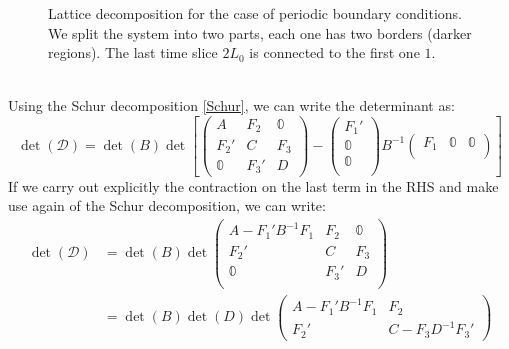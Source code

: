 \begin{figure}

    \caption{Lattice decomposition for the case of periodic boundary conditions. We split the system into two parts, each one has two borders (darker regions). The last time slice $2L_0$ is connected to the first one $1$.}
    \label{fig: fig p bc}
\end{figure}
\\ Using the Schur decomposition \eqref{Schur}, we can write the determinant as:
\begin{equation}
    \det(\mathcal{D}) = \det(B) \det \left[ \begin{pmatrix}
        A & F_2 & \mathbb{0} \\
        F_2' & C & F_3 \\
        \mathbb{0} & F_3' & D
    \end{pmatrix} - \begin{pmatrix}
        F_1' \\
        \mathbb{0} \\
        \mathbb{0} \\
    \end{pmatrix} B^{-1} \begin{pmatrix}
        F_1 & \mathbb{0} & \mathbb{0} \\
    \end{pmatrix}\right]
\end{equation}
If we carry out explicitly the contraction on the last term in the RHS and make use again of the Schur decomposition, we can write:
\begin{equation}\label{decomp pre-M}
    \begin{split}
        \det (\mathcal{D}) &= \det (B) \det \begin{pmatrix}
            A - F_1' B^{-1} F_1 & F_2 & \mathbb{0} \\
            F_2' & C & F_3 \\
            \mathbb{0} & F_3' & D \\
        \end{pmatrix} \\
        &= \det (B) \det (D) \det \begin{pmatrix}
            A - F_1' B^{-1} F_1 & F_2 \\
            F_2' & C - F_3 D^{-1} F_3'
        \end{pmatrix}
    \end{split}
\end{equation}
